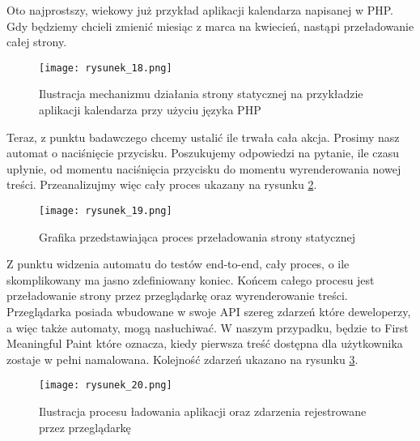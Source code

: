 Oto najprostszy, wiekowy już przykład aplikacji kalendarza napisanej w PHP. Gdy będziemy chcieli zmienić miesiąc z marca na kwiecień, nastąpi przeładowanie całej strony.

\begin{figure}[htbp]
    \centering
    \texttt{[image: rysunek\_18.png]}
    \caption{Ilustracja mechanizmu działania strony statycznej na przykładzie aplikacji kalendarza przy użyciu języka PHP \cite{app-php-calendar-pro}}
    \label{fig:rysunek_18}
\end{figure}

Teraz, z punktu badawczego chcemy ustalić ile trwała cała akcja. Prosimy nasz automat o naciśnięcie przycisku.
Poszukujemy odpowiedzi na pytanie, ile czasu upłynie, od momentu naciśnięcia przycisku do momentu wyrenderowania nowej treści. Przeanalizujmy więc cały proces ukazany na rysunku \ref{fig:rysunek_19}.

\begin{figure}[htbp]
    \centering
    \texttt{[image: rysunek\_19.png]}
    \caption{Grafika przedstawiająca proces przeładowania strony statycznej}
    \label{fig:rysunek_19}
\end{figure}

Z punktu widzenia automatu do testów end-to-end, cały proces, o ile skomplikowany ma jasno zdefiniowany koniec.
Końcem całego procesu jest przeładowanie strony przez przeglądarkę oraz wyrenderowanie treści.
Przeglądarka posiada wbudowane w swoje API szereg zdarzeń które deweloperzy, a więc także automaty, mogą nasłuchiwać.
W naszym przypadku, będzie to First Meaningful Paint \cite{rail-model} które oznacza, kiedy pierwsza treść dostępna dla użytkownika zostaje w pełni namalowana.
Kolejność zdarzeń ukazano na rysunku \ref{fig:rysunek_20}.

\begin{figure}[htbp]
    \centering
    \texttt{[image: rysunek\_20.png]}
    \caption{Ilustracja procesu ładowania aplikacji oraz zdarzenia rejestrowane przez przeglądarkę \cite{rail-model}}
    \label{fig:rysunek_20}
\end{figure}

